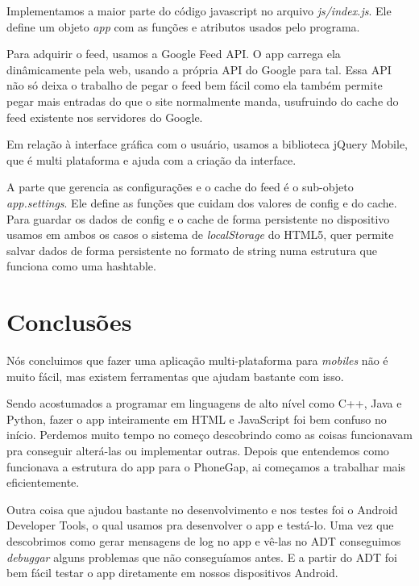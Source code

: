 Implementamos a maior parte do código javascript no arquivo \textit{js/index.js}.
Ele define um objeto \textit{app} com as funções e atributos usados pelo programa.

Para adquirir o feed, usamos a Google Feed API. O app carrega ela dinâmicamente pela web,
usando a própria API do Google para tal.
Essa API não só deixa o trabalho de pegar o feed bem fácil como ela também permite pegar mais
entradas do que o site normalmente manda, usufruindo do cache do feed existente nos servidores
do Google.

Em relação à interface gráfica com o usuário, usamos a biblioteca jQuery Mobile, que é multi
plataforma e ajuda com a criação da interface.

A parte que gerencia as configurações e o cache do feed é o sub-objeto \textit{app.settings}.
Ele define as funções que cuidam dos valores de config e do cache. Para guardar os dados de 
config e o cache de forma persistente no dispositivo usamos em ambos os casos o sistema
de \textit{localStorage} do HTML5, quer permite salvar dados de forma persistente no formato
de string numa estrutura que funciona como uma hashtable.


\section{Conclusões}
Nós concluimos que fazer uma aplicação multi-plataforma para \textit{mobiles} não é muito fácil,
mas existem ferramentas que ajudam bastante com isso.

Sendo acostumados a programar em linguagens de alto nível como C++, Java e Python, fazer o app 
inteiramente em HTML e JavaScript foi bem confuso no início. Perdemos muito tempo no começo
descobrindo como as coisas funcionavam pra conseguir alterá-las ou implementar outras.
Depois que entendemos como funcionava a estrutura do app para o PhoneGap, ai começamos a 
trabalhar mais eficientemente.

Outra coisa que ajudou bastante no desenvolvimento e nos testes foi o Android Developer Tools,
o qual usamos pra desenvolver o app e testá-lo. Uma vez que descobrimos como gerar mensagens de
log no app e vê-las no ADT conseguimos \textit{debuggar} alguns problemas que não conseguíamos 
antes. E a partir do ADT foi bem fácil testar o app diretamente em nossos dispositivos Android.



